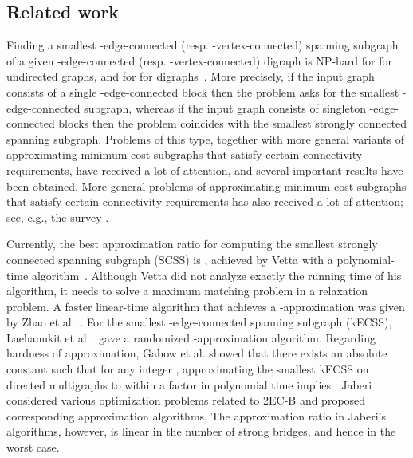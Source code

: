 \documentclass[11pt]{article}
\begin{document}
\subsection{Related work}
\label{sec:related-work}
Finding a smallest -edge-connected (resp. -vertex-connected) spanning subgraph of a given -edge-connected (resp. -vertex-connected) digraph is NP-hard for  for undirected graphs, and for  for digraphs~\cite{GJ:NP}.
More precisely, if the input graph consists of a single -edge-connected block then the problem asks for the smallest -edge-connected subgraph, whereas
if the input graph consists of  singleton -edge-connected blocks then the problem coincides with the smallest strongly connected spanning subgraph.
Problems of this type, together with more general variants of approximating minimum-cost subgraphs that satisfy certain connectivity requirements, have received a lot of attention, and several important results have been obtained. More general problems of approximating minimum-cost subgraphs that satisfy certain connectivity requirements has also received a lot of attention; see, e.g., the survey \cite{MCC:KZ:2007}.


Currently, the best approximation ratio for computing the smallest strongly connected spanning subgraph (\textsf{SCSS}) is , achieved by Vetta with a polynomial-time algorithm~\cite{Vetta:MSCS:2001}. 
Although Vetta did not analyze exactly the running time of his algorithm, it needs to solve a maximum matching problem in a relaxation problem. 
A faster linear-time algorithm that achieves a -approximation was given by Zhao et al.~\cite{ZNI:MSCS:2003}.
For the smallest -edge-connected spanning subgraph (\textsf{kECSS}), Laehanukit et al.~\cite{LGS:MSCS:2012} gave a randomized -approximation algorithm.
Regarding hardness of approximation, Gabow et al. \cite{GGTW:kECSS:2009} showed that there exists an
absolute constant  such that for any integer , approximating the smallest \textsf{kECSS} on directed multigraphs to
within a factor  in polynomial time implies . Jaberi~\cite{2vcb:jaberi} considered various optimization problems related to \textsf{2EC-B} and proposed corresponding approximation algorithms. The approximation ratio in Jaberi's algorithms, however, is linear in the number of strong bridges, and hence  in the worst case.
\end{document}
